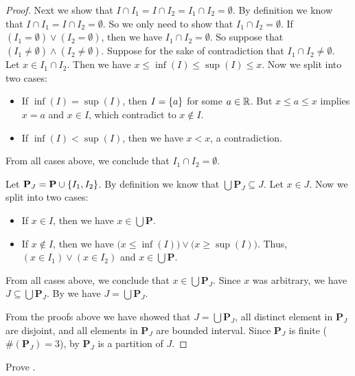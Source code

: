 \begin{proof}
  Next we show that \(I \cap I_1 = I \cap I_2 = I_1 \cap I_2 = \emptyset\).
  By definition we know that \(I \cap I_1 = I \cap I_2 = \emptyset\).
  So we only need to show that \(I_1 \cap I_2 = \emptyset\).
  If \((I_1 = \emptyset) \lor (I_2 = \emptyset)\), then we have \(I_1 \cap I_2 = \emptyset\).
  So suppose that \((I_1 \neq \emptyset) \land (I_2 \neq \emptyset)\).
  Suppose for the sake of contradiction that \(I_1 \cap I_2 \neq \emptyset\).
  Let \(x \in I_1 \cap I_2\).
  Then we have \(x \leq \inf(I) \leq \sup(I) \leq x\).
  Now we split into two cases:
  \begin{itemize}
    \item If \(\inf(I) = \sup(I)\), then \(I = \left\lbrace a\right\rbrace\) for some \(a \in \mathbb{R}\).
          But \(x \leq a \leq x\) implies \(x = a\) and \(x \in I\), which contradict to \(x \notin I\).
    \item If \(\inf(I) < \sup(I)\), then we have \(x < x\), a contradiction.
  \end{itemize}
  From all cases above, we conclude that \(I_1 \cap I_2 = \emptyset\).

  Let \(\mathbf{P}_J = \mathbf{P} \cup \left\lbrace I_1, I_2\right\rbrace\).
  By definition we know that \(\bigcup \mathbf{P}_J \subseteq J\).
  Let \(x \in J\).
  Now we split into two cases:
  \begin{itemize}
    \item If \(x \in I\), then we have \(x \in \bigcup \mathbf{P}\).
    \item If \(x \notin I\), then we have \(\big(x \leq \inf(I)\big) \lor \big(x \geq \sup(I)\big)\).
          Thus, \((x \in I_1) \lor (x \in I_2)\) and \(x \in \bigcup \mathbf{P}\).
  \end{itemize}
  From all cases above, we conclude that \(x \in \bigcup \mathbf{P}_J\).
  Since \(x\) was arbitrary, we have \(J \subseteq \bigcup \mathbf{P}_J\).
  By  we have \(J = \bigcup \mathbf{P}_J\).

  From the proofs above we have showed that \(J = \bigcup \mathbf{P}_J\), all distinct element in \(\mathbf{P}_J\) are disjoint, and all elements in \(\mathbf{P}_J\) are bounded interval.
  Since \(\mathbf{P}_J\) is finite (\(\#(\mathbf{P}_J) = 3\)), by  \(\mathbf{P}_J\) is a partition of \(J\).
\end{proof}

\exercisesection

\begin{ex}\label{i:ex:11.1.1}
  Prove .
\end{ex}

